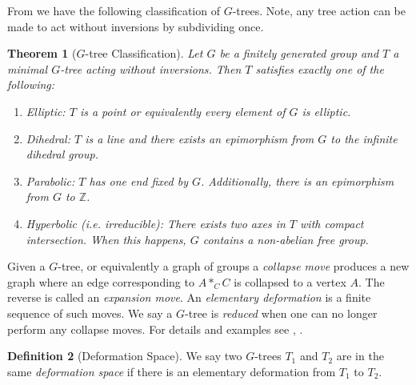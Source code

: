 \documentclass[12pt,parskip=full]{report}
\theoremstyle{plain}
\newtheorem{thm}{Theorem}[section]
\theoremstyle{definition}
\newtheorem{dfn}[thm]{Definition}
\begin{document}
From \cite{boundingcomplexity} we have the following classification of \(G\)-trees. Note, any tree action can be made to act without inversions by subdividing once.
\begin{thm}
    [\(G\)-tree Classification]
    \label{thm:classification}
    Let \(G\) be a finitely generated group and \(T\) a minimal \(G\)-tree acting without inversions. Then \(T\) satisfies exactly one of the following:
    
    \begin{enumerate}
        \item Elliptic: \(T\) is a point or equivalently every element of \(G\) is elliptic.
        \item Dihedral: \(T\) is a line and there exists an epimorphism from \(G\) to the infinite dihedral group.
        \item Parabolic: \(T\) has one end fixed by \(G\). Additionally, there is an epimorphism from \(G\) to \(\mathbb{Z}\).
        \item Hyperbolic (i.e. irreducible): There exists two axes in \(T\) with compact intersection. When this happens, \(G\) contains a non-abelian free group.
    \end{enumerate}
\end{thm}

Given a \(G\)-tree, or equivalently a graph of groups a \emph{collapse move} produces a new graph where an edge corresponding to \(A*_CC\) is collapsed to a vertex \(A\). The reverse is called an \emph{expansion move}. An \emph{elementary deformation} is a finite sequence of such moves. We say a \(G\)-tree is \emph{reduced} when one can no longer perform any collapse moves. For details and examples see \cite{foresterdeformationrigidity}, \cite{mattclay}.

\begin{dfn}
    [Deformation Space]
    We say two \(G\)-trees \(T_1\) and \(T_2\) are in the same \emph{deformation space} if there is an elementary deformation from \(T_1\) to \(T_2\).
\end{dfn}
\end{document}
